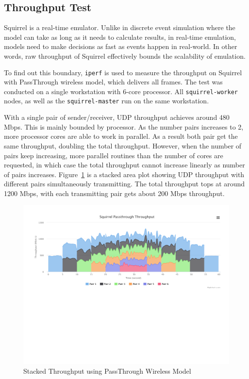 \documentclass[12pt]{report}
\begin{document}
\subsection{Throughput Test}

Squirrel is a real-time emulator. Unlike in discrete event simulation where the model can take as long as it needs to calculate results, in real-time emulation, models need to make decisions as fast as events happen in real-world. In other words, raw throughput of Squirrel effectively bounds the scalability of emulation.

To find out this boundary, \texttt{iperf} is used to measure the throughput on Squirrel with PassThrough wireless model, which delivers all frames. The test was conducted on a single workstation with 6-core processor. All \texttt{squirrel-worker} nodes, as well as the \texttt{squirrel-master} run on the same workstation.

With a single pair of sender/receiver, UDP throughput achieves around 480 Mbps. This is mainly bounded by processor. As the number pairs increases to 2, more processor cores are able to work in parallel. As a result both pair get the same throughput, doubling the total throughput. However, when the number of pairs keep increasing, more parallel routines than the number of cores are requested, in which case the total throughput cannot increase linearly as number of pairs increases. Figure~\ref{fig:passthrough} is a stacked area plot showing UDP throughput with different pairs simultaneously transmitting. The total throughput tops at around 1200 Mbps, with each transmitting pair gets about 200 Mbps throughput.

\begin{figure}[h]
  \includegraphics[width=\textwidth]{figures/results/passthrough.pdf}
  \caption{\label{fig:passthrough}Stacked Throughput using PassThrough Wireless Model}
\end{figure}
\end{document}
